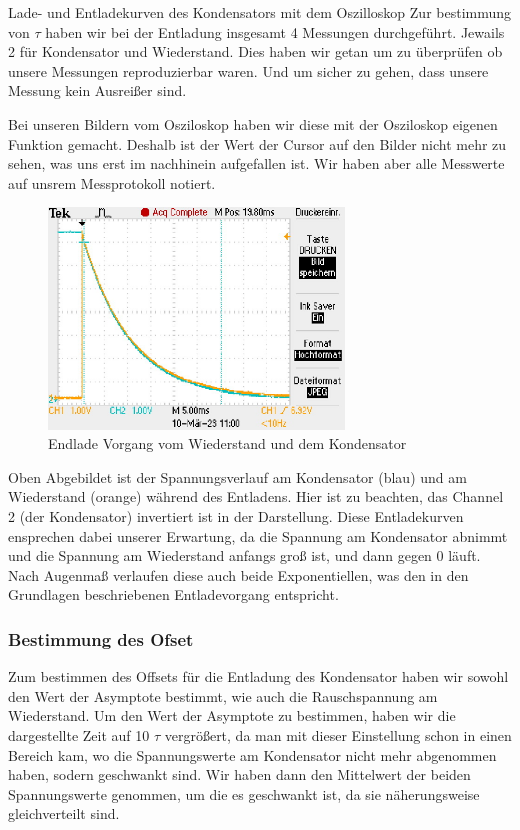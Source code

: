 \documentclass[twoside]{protokoll}
\begin{document}
\begin{aufgabe}{Lade- und Entladekurven des Kondensators mit dem Oszilloskop}
Zur bestimmung von $\tau$ haben wir bei der Entladung insgesamt 4 Messungen durchgeführt. 
Jewails 2 für Kondensator und Wiederstand. Dies haben wir getan um zu überprüfen ob unsere Messungen reproduzierbar waren. 
Und um sicher zu gehen, dass unsere Messung kein Ausreißer sind. 


Bei unseren Bildern vom Osziloskop haben wir diese mit der Osziloskop eigenen Funktion gemacht.
Deshalb ist der Wert der Cursor auf den Bilder nicht mehr zu sehen, was uns erst im nachhinein aufgefallen ist.
Wir haben aber alle Messwerte auf unsrem Messprotokoll notiert.

\begin{figure}[H]
  \centering
    \includegraphics[width=0.7\textwidth]{Bilder_Osziloskop/Entladen_Kondensator_02.pdf}
    \caption{Endlade Vorgang vom Wiederstand und dem Kondensator}
  \centering
\end{figure}
Oben Abgebildet ist der Spannungsverlauf am Kondensator (blau) und am Wiederstand (orange) während des Entladens.
Hier ist zu beachten, das Channel 2 (der Kondensator) invertiert ist in der Darstellung.
Diese Entladekurven ensprechen dabei unserer Erwartung, da die Spannung am Kondensator abnimmt und die Spannung am Wiederstand anfangs groß ist, und dann gegen 0 läuft.
Nach Augenmaß verlaufen diese auch beide Exponentiellen, was den in den Grundlagen beschriebenen Entladevorgang entspricht.

\subsubsection{Bestimmung des Ofset}
Zum bestimmen des Offsets für die Entladung des Kondensator haben wir sowohl den Wert der Asymptote bestimmt, wie auch die Rauschspannung am Wiederstand.
Um den Wert der Asymptote zu bestimmen, haben wir die dargestellte Zeit auf 10 $\tau$ vergrößert, da man mit dieser Einstellung schon in einen Bereich kam, wo die Spannungswerte am Kondensator nicht mehr abgenommen haben, sodern geschwankt sind.
Wir haben dann den Mittelwert der beiden Spannungswerte genommen, um die es geschwankt ist, da sie näherungsweise gleichverteilt sind.
 

\end{aufgabe}
\end{document}
